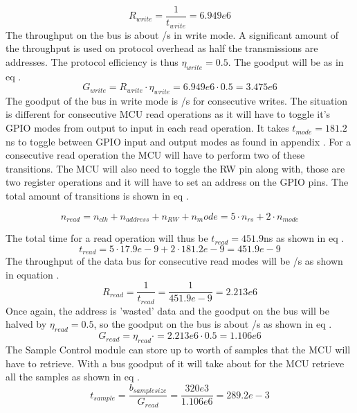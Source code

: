 \begin{equation}\label{eq:7_2_1_Write_ThroughPut}
    R_{write} = \frac{1}{t_{write}} = 6.949e6 
\end{equation}
The throughput on the bus is about /s in write mode. A significant amount of the throughput is used on protocol overhead as half the transmissions are addresses. The protocol efficiency is thus $\eta_{write} = 0.5$. The goodput will be as in eq .
\begin{equation}\label{eq:7_2_1_Write_ThroughPut2}
    G_{write} = R_{write}\cdot \eta_{write} = 6.949e6 \cdot 0.5 = 3.475e6 
\end{equation}
The goodput of the bus in write mode is /s for consecutive writes. The situation is different for consecutive MCU read operations as it will have to toggle it's GPIO modes from output to input in each read operation. It takes $t_{mode} = 181.2$ns to toggle between GPIO input and output modes as found in appendix . For a consecutive read operation the MCU will have to perform two of these transitions. The MCU will also need to toggle the RW pin along with, those are two register operations and it will have to set an address on the GPIO pins. The total amount of transitions is shown in eq .

\begin{equation}\label{eq:7_2_1_Read_Register1}
    n_{read} = n_{clk} + n_{address} + n_{RW} + {n_mode} = 5 \cdot n_{rs} + 2 \cdot n_{mode} 
\end{equation}

The total time for a read operation will thus be $t_{read} = 451.9$ns as shown in eq .
\begin{equation}\label{eq:7_2_1_Read_Register2}
    t_{read} = 5\cdot 17.9e-9 + 2\cdot 181.2e-9 = 451.9e-9 
\end{equation}
The throughput of the data bus for consecutive read modes will be /s as shown in equation .
\begin{equation}\label{eq:7_2_1_Read_Throughput}
    R_{read} = \frac{1}{t_{read}} =\frac{1}{451.9e-9} = 2.213e6  
\end{equation}
Once again, the address is 'wasted' data and the goodput on the bus will be halved by $\eta_{read} = 0.5$, so the goodput on the bus is about /s as shown in eq .
\begin{equation}\label{eq:7_2_1_Read_Goodput}
    G_{read} = \eta_{read} \cdot  = 2.213e6\cdot 0.5  = 1.106e6 
\end{equation}
The Sample Control module can store up to  worth of samples that the MCU will have to retrieve. With a bus goodput of  it will take about  for the MCU retrieve all the samples as shown in eq .
\begin{equation}\label{eq:7_2_1_SampleReadTime}
    t_{sample} = \frac{b_{samplesize}}{G_{read}} = \frac{320e3}{1.106e6} = 289.2e-3 
\end{equation}

